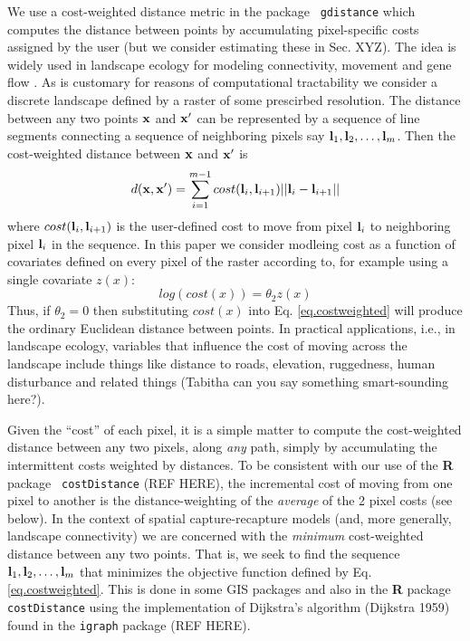 We use a cost-weighted distance metric in the package \mbox{\tt
gdistance}  which computes the distance 
between points by accumulating pixel-specific costs assigned by the user 
(but we consider estimating these in Sec. XYZ). The idea is widely used in
landscape ecology for modeling connectivity, movement and gene flow
\citep{adriaensen_etal:2003,mcrae_etal:2008}. As is customary for reasons of
computational tractability we consider a discrete landscape defined by a 
raster of some prescirbed resolution. The distance between any two points 
${\bf x}$ and ${\bf x}'$ can be represented by a sequence of line segments 
connecting a sequence of neighboring  pixels say 
${\bf l}_{1},{\bf l}_{2},\ldots,{\bf l}_{m}$. Then the cost-weighted distance 
between ${\bf x}$ and ${\bf x}'$ is
\begin{equation}
 d({\bf x},{\bf x}')
  =  \sum_{i=1}^{m-1} cost({\bf l}_{i},{\bf l}_{i+1})||{\bf l}_{i} - {\bf l}_{i+1}||
\label{eq.costweighted}
\end{equation}
where $cost({\bf l}_{i},{\bf l}_{i+1})$ is the user-defined cost to move 
from pixel ${\bf l}_{i}$ to neighboring pixel ${\bf l}_{i}$ in the sequence.
In this paper we consider modleing cost as a function of covariates
defined on every pixel of the raster according to, for example using a
single
covariate $z(x)$:
\[
 log(cost(x))=  \theta_{2} z(x) 
\]
Thus, if $\theta_{2} = 0$ then substituting $cost(x)$ into
Eq. \ref{eq.costweighted} will produce the ordinary Euclidean distance
between points. 
In practical applications, i.e., in landscape ecology, variables that
influence the cost of moving across the landscape include things like
distance to roads, elevation, ruggedness, human disturbance and
related things (Tabitha can you say something smart-sounding here?).

Given the ``cost'' of each pixel, it is a simple matter to compute the
cost-weighted distance between any two pixels, along {\it any} path,
simply by accumulating the intermittent costs weighted by distances. 
To be consistent with our use of the {\bf R} package \mbox{\tt
  costDistance} (REF HERE),
the incremental cost of moving from one pixel to another is the
distance-weighting of the {\it average} of the 2 pixel costs (see below).
In the context of spatial capture-recapture models (and, more
generally, landscape connectivity) we are concerned with the {\it
  minimum} cost-weighted distance between any two points.  That is, we
seek to find the 
sequence ${\bf l}_{1},{\bf l}_{2},\ldots,{\bf l}_{m}$ that minimizes
the objective function defined by Eq. \ref{eq.costweighted}.
This is done in some GIS packages and also in the {\bf R} package
\mbox{\tt costDistance} using the implementation of Dijkstra's algorithm (Dijkstra 1959)
found in the \mbox{\tt igraph} package (REF HERE).

